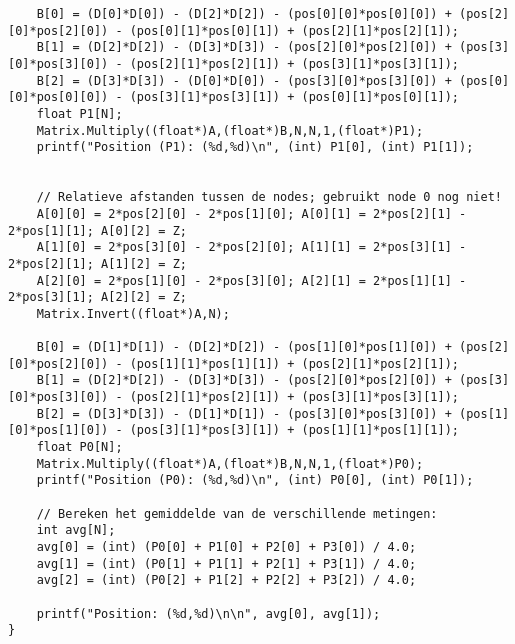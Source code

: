 \begin{lstlisting}
    B[0] = (D[0]*D[0]) - (D[2]*D[2]) - (pos[0][0]*pos[0][0]) + (pos[2][0]*pos[2][0]) - (pos[0][1]*pos[0][1]) + (pos[2][1]*pos[2][1]);
    B[1] = (D[2]*D[2]) - (D[3]*D[3]) - (pos[2][0]*pos[2][0]) + (pos[3][0]*pos[3][0]) - (pos[2][1]*pos[2][1]) + (pos[3][1]*pos[3][1]);
    B[2] = (D[3]*D[3]) - (D[0]*D[0]) - (pos[3][0]*pos[3][0]) + (pos[0][0]*pos[0][0]) - (pos[3][1]*pos[3][1]) + (pos[0][1]*pos[0][1]);
    float P1[N];
    Matrix.Multiply((float*)A,(float*)B,N,N,1,(float*)P1);
    printf("Position (P1): (%d,%d)\n", (int) P1[0], (int) P1[1]);
    
    
    // Relatieve afstanden tussen de nodes; gebruikt node 0 nog niet!
    A[0][0] = 2*pos[2][0] - 2*pos[1][0]; A[0][1] = 2*pos[2][1] - 2*pos[1][1]; A[0][2] = Z;
    A[1][0] = 2*pos[3][0] - 2*pos[2][0]; A[1][1] = 2*pos[3][1] - 2*pos[2][1]; A[1][2] = Z;
    A[2][0] = 2*pos[1][0] - 2*pos[3][0]; A[2][1] = 2*pos[1][1] - 2*pos[3][1]; A[2][2] = Z;
    Matrix.Invert((float*)A,N);
   
    B[0] = (D[1]*D[1]) - (D[2]*D[2]) - (pos[1][0]*pos[1][0]) + (pos[2][0]*pos[2][0]) - (pos[1][1]*pos[1][1]) + (pos[2][1]*pos[2][1]);
    B[1] = (D[2]*D[2]) - (D[3]*D[3]) - (pos[2][0]*pos[2][0]) + (pos[3][0]*pos[3][0]) - (pos[2][1]*pos[2][1]) + (pos[3][1]*pos[3][1]);
    B[2] = (D[3]*D[3]) - (D[1]*D[1]) - (pos[3][0]*pos[3][0]) + (pos[1][0]*pos[1][0]) - (pos[3][1]*pos[3][1]) + (pos[1][1]*pos[1][1]);
    float P0[N];
    Matrix.Multiply((float*)A,(float*)B,N,N,1,(float*)P0);
    printf("Position (P0): (%d,%d)\n", (int) P0[0], (int) P0[1]);
    
    // Bereken het gemiddelde van de verschillende metingen:
    int avg[N];
    avg[0] = (int) (P0[0] + P1[0] + P2[0] + P3[0]) / 4.0;
    avg[1] = (int) (P0[1] + P1[1] + P2[1] + P3[1]) / 4.0;
    avg[2] = (int) (P0[2] + P1[2] + P2[2] + P3[2]) / 4.0;
  
    printf("Position: (%d,%d)\n\n", avg[0], avg[1]);
}
\end{lstlisting}
